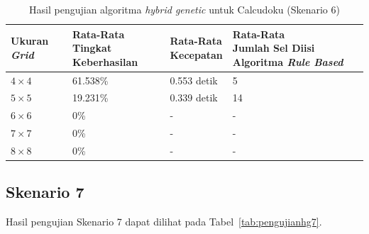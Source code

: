 \begin{table}
\centering
\captionsetup{justification=centering}
\caption[Hasil pengujian algoritma \textit{hybrid genetic} untuk Calcudoku (Skenario 6)]{Hasil pengujian algoritma \textit{hybrid genetic} untuk Calcudoku (Skenario 6)}
\begin{tabular}{| l | l | l | l |}
\hline
Ukuran \textit{Grid} & \makecell[l]{Rata-Rata \\ Tingkat Keberhasilan} & \makecell[l]{Rata-Rata \\ Kecepatan} & \makecell[l]{Rata-Rata \\ Jumlah Sel Diisi Algoritma \textit{Rule Based}} \\
\hline \hline
\begin{math}4 \times 4\end{math} & 61.538\% & 0.553 detik & 5 \\
\hline
\begin{math}5 \times 5\end{math} & 19.231\% & 0.339 detik & 14 \\
\hline
\begin{math}6 \times 6\end{math} & 0\% & - & - \\
\hline
\begin{math}7 \times 7\end{math} & 0\% & - & - \\
\hline
\begin{math}8 \times 8\end{math} & 0\% & - & - \\
\hline
\end{tabular}
\label{tab:pengujianhg6}
\end{table}

\subsection{Skenario 7}
\label{sec:skenario7}

Hasil pengujian Skenario 7 dapat dilihat pada Tabel~\ref{tab:pengujianhg7}.

